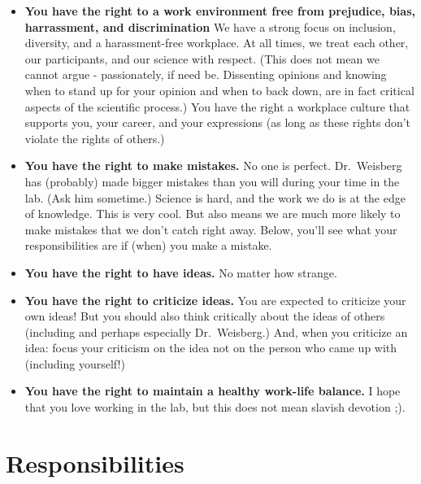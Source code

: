 \documentclass[
  12pt,
]{book}
\begin{document}
\begin{itemize}
\item
  \textbf{You have the right to a work environment free from prejudice, bias, harrassment, and discrimination}
  We have a strong focus on inclusion, diversity, and a harassment-free workplace. At all times, we treat each other, our participants, and our science with respect. (This does not mean we cannot argue - passionately, if need be. Dissenting opinions and knowing when to stand up for your opinion and when to back down, are in fact critical aspects of the scientific process.) You have the right a workplace culture that supports you, your career, and your expressions (as long as these rights don't violate the rights of others.)
\item
  \textbf{You have the right to make mistakes.} No one is perfect. Dr.~Weisberg has (probably) made bigger mistakes than you will during your time in the lab. (Ask him sometime.) Science is hard, and the work we do is at the edge of knowledge. This is very cool. But also means we are much more likely to make mistakes that we don't catch right away. Below, you'll see what your responsibilities are if (when) you make a mistake.
\item
  \textbf{You have the right to have ideas.} No matter how strange.
\item
  \textbf{You have the right to criticize ideas.} You are expected to criticize your own ideas! But you should also think critically about the ideas of others (including and perhaps especially Dr.~Weisberg.) And, when you criticize an idea: focus your criticism on the idea not on the person who came up with (including yourself!)
\item
  \textbf{You have the right to maintain a healthy work-life balance.} I hope that you love working in the lab, but this does not mean slavish devotion ;).
\end{itemize}

\hypertarget{responsibilities}{%
\section{Responsibilities}\label{responsibilities}}
\end{document}
